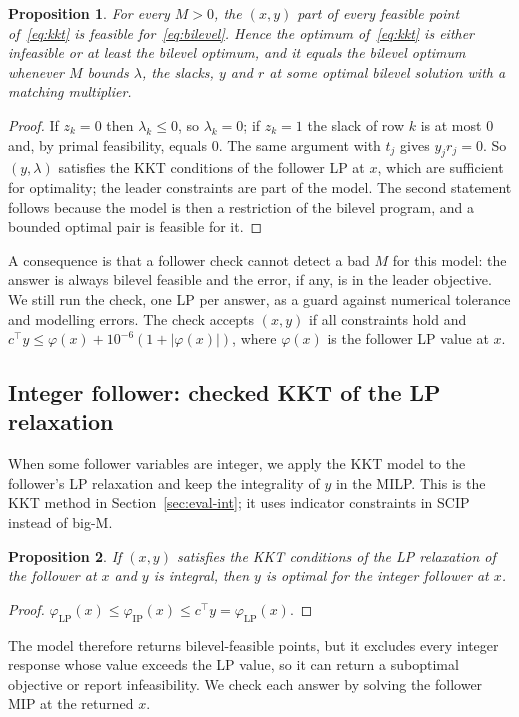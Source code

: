 \documentclass[11pt]{article}
\newtheorem{proposition}{Proposition}
\begin{document}
\begin{proposition}
\label{prop:anyM}
For every $M > 0$, the $(x,y)$ part of every feasible point of~\eqref{eq:kkt}
is feasible for~\eqref{eq:bilevel}. Hence the optimum of~\eqref{eq:kkt} is
either infeasible or at least the bilevel optimum, and it equals the bilevel
optimum whenever $M$ bounds $\lambda$, the slacks, $y$ and $r$ at some optimal
bilevel solution with a matching multiplier.
\end{proposition}
\begin{proof}
If $z_k = 0$ then $\lambda_k \le 0$, so $\lambda_k = 0$; if $z_k = 1$ the
slack of row $k$ is at most $0$ and, by primal feasibility, equals $0$. The
same argument with $t_j$ gives $y_j r_j = 0$. So $(y,\lambda)$ satisfies the
KKT conditions of the follower LP at $x$, which are sufficient for
optimality; the leader constraints are part of the model. The second
statement follows because the model is then a restriction of the bilevel
program, and a bounded optimal pair is feasible for it.
\end{proof}

A consequence is that a follower check cannot detect a bad $M$ for this
model: the answer is always bilevel feasible and the error, if any, is in
the leader objective. We still run the check, one LP per answer, as a guard
against numerical tolerance and modelling errors. The check accepts $(x,y)$
if all constraints hold and $c^\top y \le \varphi(x) + 10^{-6}(1+|\varphi(x)|)$,
where $\varphi(x)$ is the follower LP value at $x$.

\subsection{Integer follower: checked KKT of the LP relaxation}

When some follower variables are integer, we apply the KKT model to the
follower's LP relaxation and keep the integrality of $y$ in the MILP. This is
the KKT method in Section~\ref{sec:eval-int}; it uses indicator constraints
in SCIP instead of big-M.

\begin{proposition}
\label{prop:relax}
If $(x,y)$ satisfies the KKT conditions of the LP relaxation of the follower
at $x$ and $y$ is integral, then $y$ is optimal for the integer follower at
$x$.
\end{proposition}
\begin{proof}
$\varphi_{\mathrm{LP}}(x) \le \varphi_{\mathrm{IP}}(x) \le c^\top y =
\varphi_{\mathrm{LP}}(x)$.
\end{proof}
The model therefore returns bilevel-feasible points, but it excludes every
integer response whose value exceeds the LP value, so it can return a
suboptimal objective or report infeasibility. We check each answer by
solving the follower MIP at the returned $x$.
\end{document}
